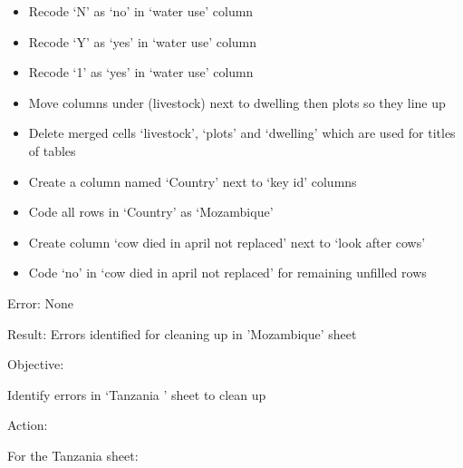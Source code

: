 \documentclass{article}
\begin{document}
\begin{itemize}
\item Recode ‘N’ as ‘no’ in ‘water use’ column
\item Recode ‘Y’ as ‘yes’ in ‘water use’ column
\item Recode ‘1’ as ‘yes’ in ‘water use’ column
\item Move columns under (livestock) next to dwelling then plots so they line up
\item Delete merged cells ‘livestock’, ‘plots’ and ‘dwelling’ which are used for titles of tables
\item Create a column named ‘Country’ next to ‘key id’ columns
\item Code all rows in ‘Country’ as ‘Mozambique’
\item Create column ‘cow died in april not replaced’ next to ‘look after cows’
\item Code ‘no’ in ‘cow died in april not replaced’ for remaining unfilled rows
\end{itemize}
Error: None\par
Result: Errors identified for cleaning up in 'Mozambique' sheet \par
Objective: \par
Identify errors in ‘Tanzania ’ sheet to clean up\par
Action:\par
For the Tanzania sheet:
\end{document}
